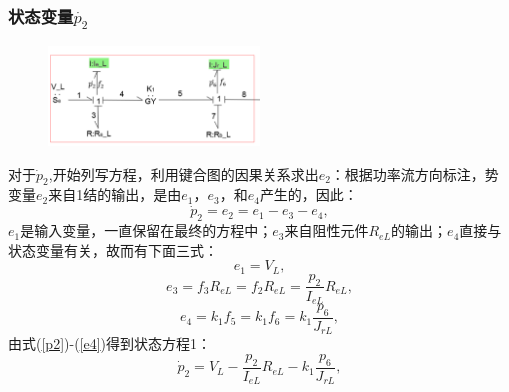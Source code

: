 \subsubsection{状态变量$\dot{ p_2 }$}
\begin{figure}[h]
	\centering
	\includegraphics[width=0.5\textwidth]{fig/equation1.png}
	\caption{}\label{fig:equation1}
\end{figure}
对于$\dot{p} _ { 2 }$,开始列写方程，利用键合图的因果关系求出$e_2$：根据功率流方向标注，势变量$e_2$来自1结的输出，是由$e_1$，$e_3$，和$e_4$产生的，因此：
\begin{equation}\label{p2}
\dot{p} _ { 2 } = e _ { 2 } = e _ { 1 } - e _ { 3 } - e _ { 4 },
\end{equation}
$e_1$是输入变量，一直保留在最终的方程中；$e_3$来自阻性元件$R _ { eL }$的输出；$e_4$直接与状态变量有关，故而有下面三式：
\begin{equation}\label{e1}
e _ { 1} = V_L,
\end{equation}
\begin{equation}\label{e3}
e _ { 3 } = f _ { 3 } R _ { eL  }  = f _ { 2 } R _ { eL }  = \frac { p _ { 2 } } { I _ { eL } } R _ { eL},
\end{equation}
\begin{equation}\label{e4}
e _ { 4 } = k _ { 1 } f _ { 5 } = k _ { 1 } f _ { 6 } = k _ { 1 } \frac { p _ { 6 } } { J _ { r L}  },
\end{equation}
由式(\ref{p2})-(\ref{e4})得到状态方程1：
\begin{equation}
\dot { p } _ { 2 } = V _ {L}  - \frac { p _ { 2 } } { I _ { eL}  } R _ { eL} - k _ { 1 } \frac { p _ { 6 } } { J _ { rL} },
\end{equation}

